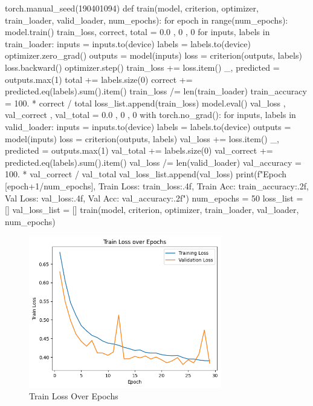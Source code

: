 \documentclass[11pt]{article}
\begin{document}
\begin{python}
torch.manual_seed(190401094)
def train(model, criterion, optimizer, train_loader, valid_loader, num_epochs):
    for epoch in range(num_epochs):
        model.train()
        train_loss, correct, total = 0.0 , 0 , 0
        for inputs, labels in train_loader:
            inputs = inputs.to(device)
            labels = labels.to(device)
            optimizer.zero_grad()
            outputs = model(inputs)
            loss = criterion(outputs, labels)
            loss.backward()
            optimizer.step()
            train_loss += loss.item()
            _, predicted = outputs.max(1)
            total += labels.size(0)
            correct += predicted.eq(labels).sum().item()
        train_loss /= len(train_loader)
        train_accuracy = 100. * correct / total
        loss_list.append(train_loss)
        model.eval()
        val_loss , val_correct , val_total = 0.0 , 0 , 0
        with torch.no_grad():
            for inputs, labels in valid_loader:
                inputs = inputs.to(device)
                labels = labels.to(device)
                outputs = model(inputs)
                loss = criterion(outputs, labels)
                val_loss += loss.item()
                _, predicted = outputs.max(1)
                val_total += labels.size(0)
                val_correct += predicted.eq(labels).sum().item()
        val_loss /= len(valid_loader)
        val_accuracy = 100. * val_correct / val_total
        val_loss_list.append(val_loss)  
        print(f"Epoch [{epoch+1}/{num_epochs}], Train Loss: {train_loss:.4f}, Train Acc: {train_accuracy:.2f}, Val Loss: {val_loss:.4f}, Val Acc: {val_accuracy:.2f}")
num_epochs = 50
loss_list = []
val_loss_list = []
train(model, criterion, optimizer, train_loader, val_loader, num_epochs)
\end{python}


\begin{figure}[ht!]
    \centering
    \includegraphics[width=0.75\textwidth]{figure.png}
    \caption{Train Loss Over Epochs }
    \label{fig:figure}
\end{figure}
\end{document}

